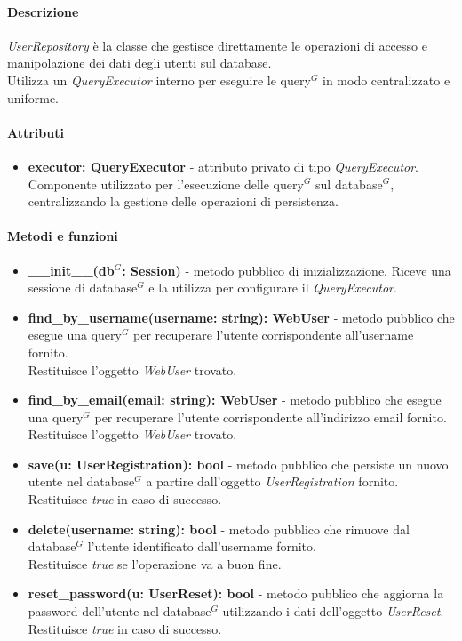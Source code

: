 \paragraph{Descrizione}
\textit{UserRepository} è la classe che gestisce direttamente le operazioni di accesso e manipolazione dei dati degli utenti sul database.\\
Utilizza un \textit{QueryExecutor} interno per eseguire le query$^G$ in modo centralizzato e uniforme.

\paragraph{Attributi}
\begin{itemize}
	\item \textbf{executor: QueryExecutor} - attributo privato di tipo \textit{QueryExecutor}.
	Componente utilizzato per l'esecuzione delle query$^G$ sul database$^G$, centralizzando la gestione delle operazioni di persistenza.
\end{itemize}

\paragraph{Metodi e funzioni}
\begin{itemize}
	\item \textbf{\_\_init\_\_(db$^G$: Session)} - metodo pubblico di inizializzazione.
	Riceve una sessione di database$^G$ e la utilizza per configurare il \textit{QueryExecutor}.
	\item \textbf{find\_by\_username(username: string): WebUser} - metodo pubblico che esegue una query$^G$ per recuperare l'utente corrispondente all'username fornito.\\
	Restituisce l'oggetto \textit{WebUser} trovato.
	\item \textbf{find\_by\_email(email: string): WebUser} - metodo pubblico che esegue una query$^G$ per recuperare l'utente corrispondente all'indirizzo email fornito.\\
	Restituisce l'oggetto \textit{WebUser} trovato.
	\item \textbf{save(u: UserRegistration): bool} - metodo pubblico che persiste un nuovo utente nel database$^G$ a partire dall'oggetto \textit{UserRegistration} fornito.\\
	Restituisce \textit{true} in caso di successo.
	\item \textbf{delete(username: string): bool} - metodo pubblico che rimuove dal database$^G$ l'utente identificato dall'username fornito.\\
	Restituisce \textit{true} se l'operazione va a buon fine.
	\item \textbf{reset\_password(u: UserReset): bool} - metodo pubblico che aggiorna la password dell'utente nel database$^G$ utilizzando i dati dell'oggetto \textit{UserReset}.\\
	Restituisce \textit{true} in caso di successo.
\end{itemize}

